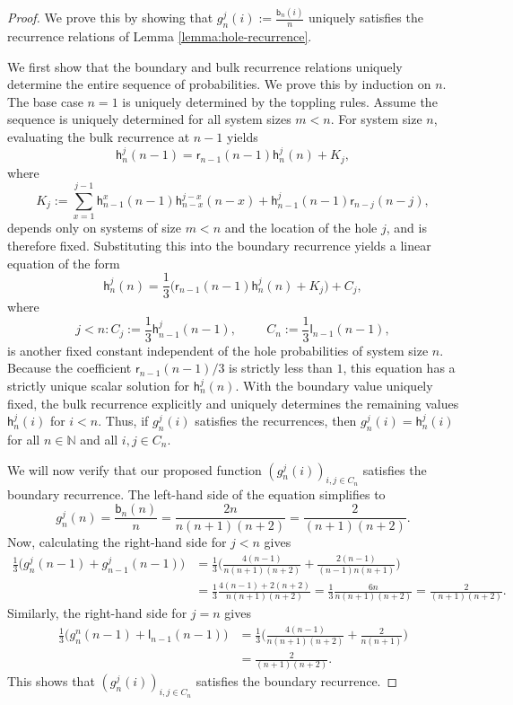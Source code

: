 \documentclass[10pt,a4paper]{amsart}
\newcommand{\N}{\mathbb{N}}
\newcommand{\sgrboth}[2]{\mathsf{b}_{#1}(#2)}
\newcommand{\sgrleft}[2]{\mathsf{l}_{#1}(#2)}
\newcommand{\sgrright}[2]{\mathsf{r}_{#1}(#2)}
\begin{document}
\begin{proof}
    We prove this by showing that $g_n^j(i) := \frac{\sgrboth{n}{i}}{n}$ uniquely satisfies the recurrence relations of Lemma \ref{lemma:hole-recurrence}.
    
     We first show that the boundary and bulk recurrence relations uniquely determine the entire sequence of probabilities. We prove this by induction on $n$. The base case $n=1$ is uniquely determined by the toppling rules. Assume the sequence is uniquely determined for all system sizes $m < n$. For system size $n$, evaluating the bulk recurrence at $n-1$ yields $$\mathsf{h}_n^j(n-1) = \sgrright{n-1}{n-1}\mathsf{h}_n^j(n) + K_j,$$ where 
     $$K_j:=\sum_{x=1}^{j-1} \mathsf{h}_{n-1}^x(n-1)\mathsf{h}_{n-x}^{j-x}(n-x) + \mathsf{h}_{n-1}^j(n-1)\sgrright{n-j}{n-j},$$
     depends only on systems of size $m < n$ and the location of the hole $j$, and is therefore fixed. Substituting this into the boundary recurrence yields a linear equation of the form
    $$ \mathsf{h}_n^j(n) = \frac{1}{3} \Big( \sgrright{n-1}{n-1}\mathsf{h}_n^j(n) + K_j \Big) + C_j, $$
    where
    $$j<n:C_j:=\frac{1}{3}\mathsf{h}_{n-1}^j(n-1),\hspace{1cm}C_n:=\frac{1}{3}\sgrleft{n-1}{n-1},$$
    is another fixed constant independent of the hole probabilities of system size $n$. Because the coefficient $\sgrright{n-1}{n-1}/3$ is strictly less than $1$, this equation has a strictly unique scalar solution for $\mathsf{h}_n^j(n)$. With the boundary value uniquely fixed, the bulk recurrence explicitly and uniquely determines the remaining values $\mathsf{h}_n^j(i)$ for $i < n$. Thus, if $g_n^j(i)$ satisfies the recurrences, then $g_n^j(i)= \mathsf{h}_n^j(i)$ for all $n\in\N$ and all $i,j\in C_n$.
    
    We will now verify that our proposed function $(g_n^j(i))_{i,j\in C_n}$ satisfies the boundary recurrence. The left-hand side of the equation simplifies to
    $$g_n^j(n) = \frac{\sgrboth{n}{n}}{n} = \frac{2n}{n(n+1)(n+2)} = \frac{2}{(n+1)(n+2)}.$$
    Now, calculating the right-hand side for $j < n$ gives
    \begin{align*}
        \frac{1}{3} \bigg( g_n^j(n-1) + g_{n-1}^j(n-1)\bigg) &= \frac{1}{3} \bigg(\frac{4(n-1)}{n(n+1)(n+2)} + \frac{2(n-1)}{(n-1)n(n+1)}\bigg)\\ &= \frac{1}{3} \frac{4(n-1) + 2(n+2)}{n(n+1)(n+2)}  = \frac{1}{3} \frac{6n}{n(n+1)(n+2)}  = \frac{2}{(n+1)(n+2)}. 
    \end{align*} 
    Similarly, the right-hand side for $j = n$ gives
    \begin{align*}
        \frac{1}{3} \bigg( g_n^n(n-1) + \sgrleft{n-1}{n-1}\bigg) &= \frac{1}{3} \bigg(\frac{4(n-1)}{n(n+1)(n+2)} + \frac{2}{n(n+1)}\bigg)\\ &= \frac{2}{(n+1)(n+2)}. 
    \end{align*} 
    This shows that $(g_n^j(i))_{i,j\in C_n}$ satisfies the boundary recurrence.
    

\end{proof}
\end{document}
